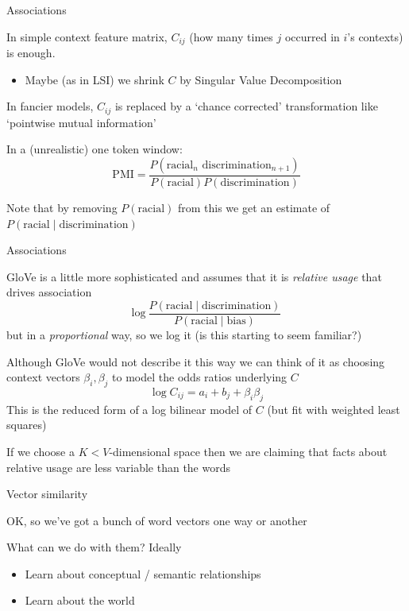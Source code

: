 \documentclass{hertieteaching}
\begin{document}
\begin{frame}{Associations}

In simple context feature matrix, $C_\mathit{ij}$ (how many times $j$ occurred in $i$'s contexts) is enough. 
\begin{itemize}
  \item Maybe (as in LSI) we shrink $C$ by Singular Value Decomposition
\end{itemize}

In fancier models, $C_\mathit{ij}$ is replaced by a `chance corrected' transformation like `pointwise mutual information'

In a (unrealistic) one token window:
$$
\text{PMI} = \frac{P(\text{racial}_n\text{ discrimination}_{n+1})}
{P(\text{racial}) P(\text{discrimination})}
$$ 

Note that by removing $P(\text{racial})$ from this we get an estimate of $P(\text{racial} \mid \text{discrimination})$


\end{frame}
\begin{frame}{Associations}

\textsf{GloVe} \parencite{Pennington.etal2014} is a little more sophisticated and assumes that it is \textit{relative usage} that drives association
$$
\text{log}~\frac{P(\text{racial} \mid \text{discrimination})}
{P(\text{racial} \mid \text{bias})}
$$
but in a \textit{proportional} way, so we log it (is this starting to seem familiar?)

\pause

Although \textsf{GloVe} would not describe it this way we can think of it as choosing context vectors $\beta_i, \beta_j$ to model the odds ratios underlying $C$
$$
\log C_\mathit{ij} = a_i + b_j + \beta_i \beta_j
$$
This is the reduced form of a log bilinear model of $C$ (but fit with weighted least squares)

If we choose a $K<V$-dimensional space then we are claiming that facts about relative usage are less 
variable than the words

\end{frame}


\begin{frame}[fragile]{Vector similarity}

OK, so we've got a bunch of word vectors one way or another

What can we do with them? Ideally
\begin{itemize}
  \item Learn about conceptual / semantic relationships
  \item Learn about the world
\end{itemize}




\end{frame}
\end{document}
